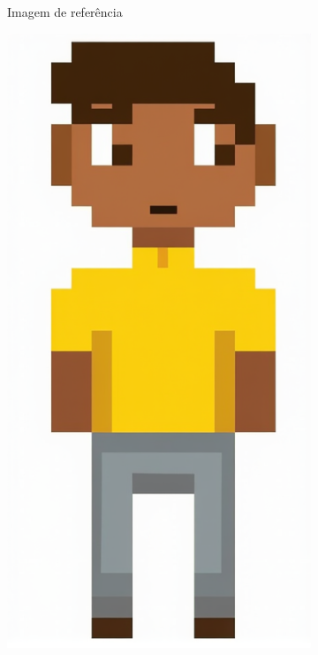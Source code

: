 \begin{figure}[htbp]
\begin{subfigure}{0.21\linewidth}
        \caption{\small Imagem de referência}
        \label{fig:CGDreamPablo}
    \end{subfigure}
    \begin{subfigure}{0.21\linewidth}
        \includegraphics[width=1\linewidth]{figs/cgDream/res_img_fluxDev1b.png}

\end{subfigure}
\end{figure}
